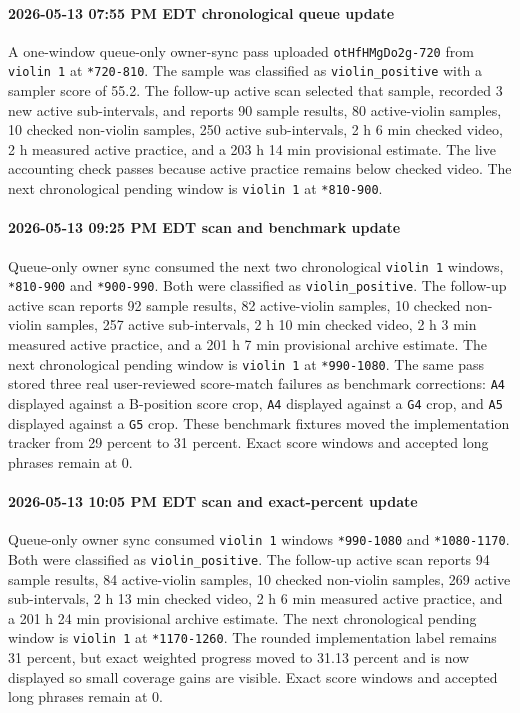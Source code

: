 \paragraph{2026-05-13 07:55 PM EDT chronological queue update} A one-window queue-only owner-sync pass uploaded \texttt{otHfHMgDo2g-720} from \texttt{violin 1} at \texttt{*720-810}. The sample was classified as \texttt{violin\_positive} with a sampler score of 55.2. The follow-up active scan selected that sample, recorded 3 new active sub-intervals, and reports 90 sample results, 80 active-violin samples, 10 checked non-violin samples, 250 active sub-intervals, 2 h 6 min checked video, 2 h measured active practice, and a 203 h 14 min provisional estimate. The live accounting check passes because active practice remains below checked video. The next chronological pending window is \texttt{violin 1} at \texttt{*810-900}.
\paragraph{2026-05-13 09:25 PM EDT scan and benchmark update} Queue-only owner sync consumed the next two chronological \texttt{violin 1} windows, \texttt{*810-900} and \texttt{*900-990}. Both were classified as \texttt{violin\_positive}. The follow-up active scan reports 92 sample results, 82 active-violin samples, 10 checked non-violin samples, 257 active sub-intervals, 2 h 10 min checked video, 2 h 3 min measured active practice, and a 201 h 7 min provisional archive estimate. The next chronological pending window is \texttt{violin 1} at \texttt{*990-1080}. The same pass stored three real user-reviewed score-match failures as benchmark corrections: \texttt{A4} displayed against a B-position score crop, \texttt{A4} displayed against a \texttt{G4} crop, and \texttt{A5} displayed against a \texttt{G5} crop. These benchmark fixtures moved the implementation tracker from 29 percent to 31 percent. Exact score windows and accepted long phrases remain at 0.
\paragraph{2026-05-13 10:05 PM EDT scan and exact-percent update} Queue-only owner sync consumed \texttt{violin 1} windows \texttt{*990-1080} and \texttt{*1080-1170}. Both were classified as \texttt{violin\_positive}. The follow-up active scan reports 94 sample results, 84 active-violin samples, 10 checked non-violin samples, 269 active sub-intervals, 2 h 13 min checked video, 2 h 6 min measured active practice, and a 201 h 24 min provisional archive estimate. The next chronological pending window is \texttt{violin 1} at \texttt{*1170-1260}. The rounded implementation label remains 31 percent, but exact weighted progress moved to 31.13 percent and is now displayed so small coverage gains are visible. Exact score windows and accepted long phrases remain at 0.
